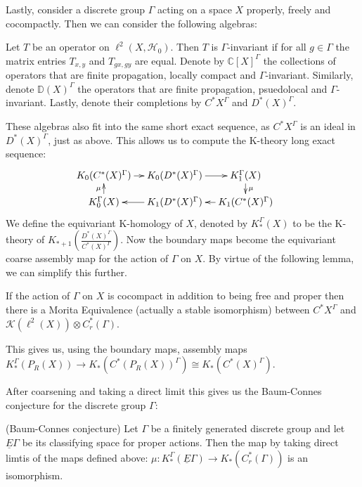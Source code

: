 Lastly, consider a discrete group $\Gamma$ acting on a space $X$ properly, freely and cocompactly. Then we can consider the following algebras:

\begin{definition}
Let $T$ be an operator on $\ell^{2}(X,\mathcal{H}_{0})$. Then $T$ is $\Gamma$-invariant if for all $g \in \Gamma$ the matrix entries $T_{x,y}$ and $T_{gx,gy}$ are equal. Denote by $\mathbb{C}[X]^{\Gamma}$ the collections of operators that are finite propagation, locally compact and $\Gamma$-invariant. Similarly, denote $\mathbb{D}(X)^{\Gamma}$ the operators that are finite propagation, psuedolocal and $\Gamma$-invariant. Lastly, denote their completions by $C^{*}X^{\Gamma}$ and $D^{*}(X)^{\Gamma}$.
\end{definition}

These algebras also fit into the same short exact sequence, as $C^{*}X^{\Gamma}$ is an ideal in $D^{*}(X)^{\Gamma}$, just as above. This allows us to compute the K-theory long exact sequence:
\begin{equation*}
\xymatrix@=1em{
K_{0}(C^{*}(X)^{\Gamma}) \ar[r] & K_{0}(D^{*}(X)^{\Gamma}) \ar[r]& K_{1}^{\Gamma}(X)\ar[d]^{\mu} & \\
K_{0}^{\Gamma}(X)\ar[u]^{\mu}& K_{1}(D^{*}(X)^{\Gamma}) \ar[l]& K_{1}(C^{*}(X)^{\Gamma})\ar[l] &
}
\end{equation*}
We define the equivariant K-homology of $X$, denoted by $K_{*}^{\Gamma}(X)$ to be the K-theory of $K_{*+1}(\frac{D^{*}(X)^{\Gamma}}{C^{*}(X)^{\Gamma}}).$  Now the boundary maps become the equivariant coarse assembly map for the action of $\Gamma$ on $X$. By virtue of the following lemma, we can simplify this further.

\begin{lemma}
If the action of $\Gamma$ on $X$ is cocompact in addition to being free and proper then there is a Morita Equivalence (actually a stable isomorphism) between $C^{*}X^{\Gamma}$ and $\mathcal{K}(\ell^{2}(X))\otimes C^{*}_{r}(\Gamma)$.
\end{lemma}

This gives us, using the boundary maps, assembly maps $K_{*}^{\Gamma}(P_{R}(X)) \rightarrow K_{*}(C^{*}(P_{R}(X))^{\Gamma}) \cong K_{*}(C^{*}(X)^{\Gamma})$.

After coarsening and taking a direct limit this gives us the Baum-Connes conjecture for the discrete group $\Gamma$:

\begin{conjecture}(Baum-Connes conjecture)
Let $\Gamma$ be a finitely generated discrete group and let $\underline{E}\Gamma$ be its classifying space for proper actions. Then the map by taking direct limtis of the maps defined above: $\mu: K_{*}^{\Gamma}(\underline{E}\Gamma) \rightarrow K_{*}(C^{*}_{r}(\Gamma))$ is an isomorphism.
\end{conjecture}

